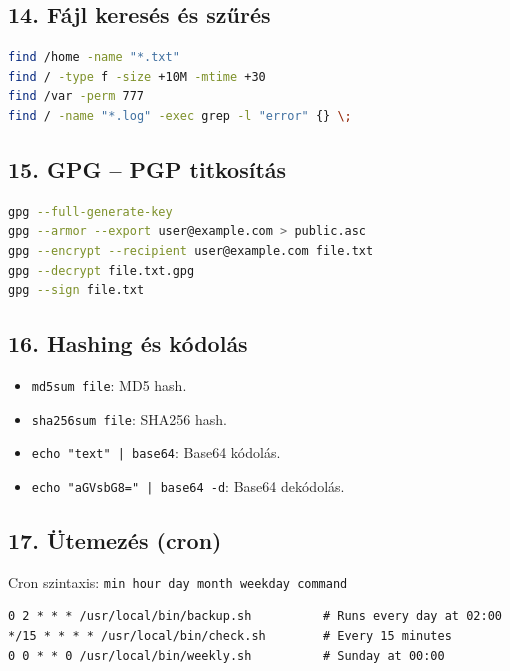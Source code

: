 \documentclass[12pt,a4paper]{article}
\begin{document}
\subsection{14. Fájl keresés és szűrés}

\begin{lstlisting}[language=bash,caption={find parancs}]
find /home -name "*.txt"
find / -type f -size +10M -mtime +30
find /var -perm 777
find / -name "*.log" -exec grep -l "error" {} \;
\end{lstlisting}

\subsection{15. GPG – PGP titkosítás}

\begin{lstlisting}[language=bash,caption={GPG kulcsgenerálás és titkosítás}]
gpg --full-generate-key
gpg --armor --export user@example.com > public.asc
gpg --encrypt --recipient user@example.com file.txt
gpg --decrypt file.txt.gpg
gpg --sign file.txt
\end{lstlisting}

\subsection{16. Hashing és kódolás}

\begin{itemize}
  \item \texttt{md5sum file}: MD5 hash.
  \item \texttt{sha256sum file}: SHA256 hash.
  \item \texttt{echo "text" | base64}: Base64 kódolás.
  \item \texttt{echo "aGVsbG8=" | base64 -d}: Base64 dekódolás.
\end{itemize}

\subsection{17. Ütemezés (cron)}

Cron szintaxis: \texttt{min hour day month weekday command}

\begin{verbatim}
0 2 * * * /usr/local/bin/backup.sh          # Runs every day at 02:00
*/15 * * * * /usr/local/bin/check.sh        # Every 15 minutes
0 0 * * 0 /usr/local/bin/weekly.sh          # Sunday at 00:00
\end{verbatim}
\end{document}
